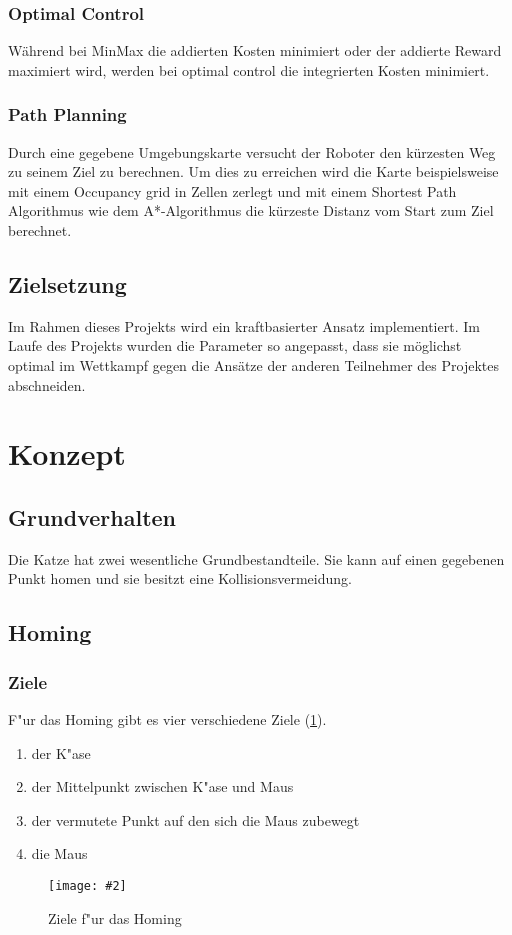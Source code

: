 \documentclass[
a4paper,     %
12pt         %
]{scrartcl}  %
\newcommand{\mygraphics}[3]{
\begin{figure}[!h]
  \begin{center}
    \texttt{[image: \#2]} \\
    \caption{#3}\label{fig:#2}
  \end{center}
\end{figure}

}
\begin{document}
\subsubsection{Optimal Control}
Während bei MinMax die addierten Kosten minimiert oder der addierte Reward maximiert wird, werden bei optimal control die integrierten Kosten minimiert.
\subsubsection{Path Planning}
Durch eine gegebene Umgebungskarte versucht der Roboter den kürzesten Weg zu seinem Ziel zu berechnen. Um dies zu erreichen wird die Karte beispielsweise mit einem Occupancy grid in Zellen zerlegt und mit einem Shortest Path Algorithmus wie dem A*-Algorithmus die kürzeste Distanz vom Start zum Ziel berechnet.  
\subsection{Zielsetzung}
Im Rahmen dieses Projekts wird ein kraftbasierter Ansatz implementiert. Im Laufe des Projekts wurden die Parameter so angepasst, dass sie möglichst optimal im Wettkampf gegen die Ansätze der anderen Teilnehmer des Projektes abschneiden.
\clearpage
\section{Konzept}
\subsection{Grundverhalten}
Die Katze hat zwei wesentliche Grundbestandteile. Sie kann auf einen gegebenen Punkt  \glqq homen\grqq{} und sie besitzt eine Kollisionsvermeidung.
\subsection{Homing}
\subsubsection{Ziele}
F"ur das Homing gibt es vier verschiedene Ziele (\ref{fig:homingZiele.png}). 
\begin{enumerate}
\item der K"ase
\item der Mittelpunkt zwischen K"ase und Maus
\item der vermutete Punkt auf den sich die Maus zubewegt
\item die Maus
\end{enumerate}
\mygraphics{0.7\textwidth}{homingZiele.png}{Ziele f"ur das Homing}
\clearpage
\end{document}
